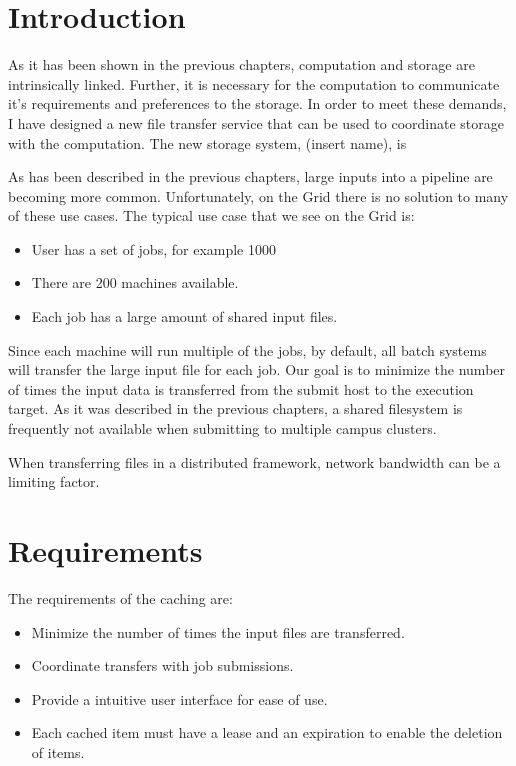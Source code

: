 \label{chapter:coordinatingstorage}


\section{Introduction}

As it has been shown in the previous chapters, computation and storage are intrinsically linked.  Further, it is necessary for the computation to communicate it's requirements and preferences to the storage.  In order to meet these demands, I have designed a new file transfer service that can be used to coordinate storage with the computation.  The new storage system, (insert name), is  

As has been described in the previous chapters, large inputs into a pipeline are becoming more common.  Unfortunately, on the Grid there is no solution to many of these use cases.  The typical use case that we see on the Grid is:

\begin{itemize}

\item User has a set of jobs, for example 1000
\item There are 200 machines available.
\item Each job has a large amount of shared input files.

\end{itemize}

Since each machine will run multiple of the jobs, by default, all batch systems will transfer the large input file for each job.  Our goal is to minimize the number of times the input data is transferred from the submit host to the execution target.  As it was described in the previous chapters, a shared filesystem is frequently not available when submitting to multiple campus clusters.

When transferring files in a distributed framework, network bandwidth can be a limiting factor. 


\section{Requirements}

The requirements of the caching are:
\begin{itemize}
\item Minimize the number of times the input files are transferred.
\item Coordinate transfers with job submissions.
\item Provide a intuitive user interface for ease of use.
\item Each cached item must have a lease and an expiration to enable the deletion of items.
\end{itemize}

